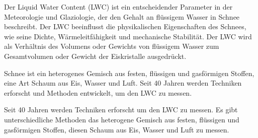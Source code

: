 Der Liquid Water Content (LWC) ist ein entscheidender Parameter in der Meteorologie und Glaziologie, der den Gehalt an flüssigem Wasser in Schnee beschreibt. Der LWC beeinflusst die physikalischen Eigenschaften des Schnees, wie seine Dichte, Wärmeleitfähigkeit und mechanische Stabilität. Der LWC wird als Verhältnis des Volumens oder Gewichts von flüssigem Wasser zum Gesamtvolumen oder Gewicht der Eiskristalle ausgedrückt.

Schnee ist ein heterogenes Gemisch aus festen, flüssigen und gasförmigen Stoffen, eine Art Schaum aus Eis, Wasser und Luft. Seit 40 Jahren werden Techniken erforscht und Methoden entwickelt, um den LWC zu messen. 

Seit 40 Jahren werden Techniken erforscht um den LWC zu messen. Es gibt unterschiedliche Methoden das heterogene Gemisch aus festen, flüssigen und gasförmigen Stoffen, diesen Schaum aus Eis, Wasser und Luft zu messen.
